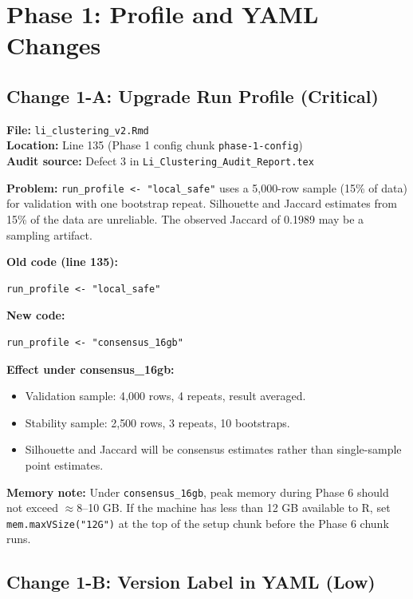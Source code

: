 \documentclass[11pt]{article}
\newcommand{\rfile}[1]{\texttt{#1}}
\newcommand{\rcode}[1]{\texttt{#1}}
\begin{document}
\section{Phase 1: Profile and YAML Changes}

\subsection{Change 1-A: Upgrade Run Profile (Critical)}

\textbf{File:} \rfile{li\_clustering\_v2.Rmd}\\
\textbf{Location:} Line 135 (Phase 1 config chunk \rcode{phase-1-config})\\
\textbf{Audit source:} Defect 3 in \rfile{Li\_Clustering\_Audit\_Report.tex}

\textbf{Problem:} \rcode{run\_profile <- "local\_safe"} uses a 5{,}000-row
sample (15\% of data) for validation with one bootstrap repeat.
Silhouette and Jaccard estimates from 15\% of the data are unreliable.
The observed Jaccard of 0.1989 may be a sampling artifact.

\textbf{Old code (line 135):}
\begin{lstlisting}
run_profile <- "local_safe"
\end{lstlisting}

\textbf{New code:}
\begin{lstlisting}
run_profile <- "consensus_16gb"
\end{lstlisting}

\textbf{Effect under consensus\_16gb:}
\begin{itemize}
\item Validation sample: 4{,}000 rows, 4 repeats, result averaged.
\item Stability sample: 2{,}500 rows, 3 repeats, 10 bootstraps.
\item Silhouette and Jaccard will be consensus estimates rather than
  single-sample point estimates.
\end{itemize}

\textbf{Memory note:} Under \rcode{consensus\_16gb}, peak memory during
Phase 6 should not exceed $\approx$8--10 GB. If the machine has less than
12 GB available to R, set \rcode{mem.maxVSize("12G")} at the top of the
setup chunk before the Phase 6 chunk runs.

\subsection{Change 1-B: Version Label in YAML (Low)}
\end{document}
